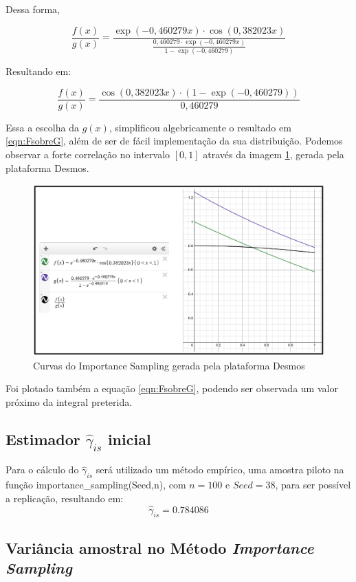 \documentclass{article}
\begin{document}
Dessa forma,

\begin{equation*}
    \frac{f(x)}{g(x)}=\frac{\exp(-0,460279x)\cdot\cos(0,382023x)}{\frac{0,460279\cdot \exp(-0,460279x)}{1-\exp(-0,460279)}}
\end{equation*}

Resultando em:

\begin{equation}
    \frac{f(x)}{g(x)} = \frac{\cos(0,382023x)\cdot(1-\exp(-0,460279))}{0,460279}
    \label{eqn:FsobreG}
\end{equation}


Essa a escolha da $g(x)$, simplificou algebricamente o resultado em \ref{eqn:FsobreG}, além de ser de fácil implementação da sua distribuição. Podemos observar a forte correlação no intervalo $[0,1]$ através da imagem \ref{fig:ImpSamDesmos}, gerada pela plataforma Desmos\cite{desmos}. 

\begin{figure}[H]
    \centering
    \includegraphics[width=.7\linewidth]{Imagens/Desmos_ImportanceSampling.png}
    \caption{Curvas do Importance Sampling gerada pela plataforma Desmos}
    \label{fig:ImpSamDesmos}
\end{figure}

Foi plotado também a equação \ref{eqn:FsobreG}, podendo ser observada um valor próximo da integral preterida.




\subsection{Estimador $\hat{\gamma}_{is}$ inicial}
Para o cálculo do $\hat{\gamma}_{is}$ será utilizado um método empírico, uma amostra piloto na função importance\_sampling(Seed,n), com $n=100$ e $Seed=38$, para ser possível a replicação, resultando em:
\[
    \hat{\gamma}_{is} = 0.784086
\]

\subsection{Variância amostral no Método \textit{Importance Sampling}}
\end{document}
